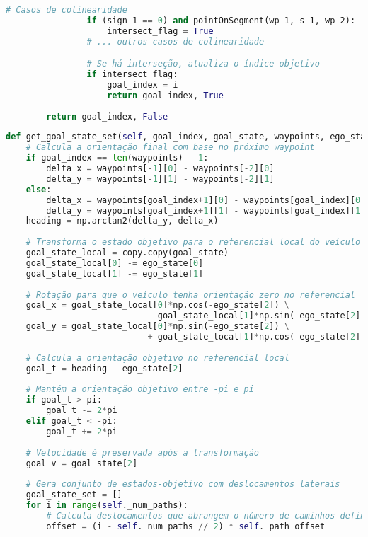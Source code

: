 \documentclass[
	12pt,				%
	oneside, %
	a4paper,			%
	english,			%
	french,				%
	spanish,			%
	brazil				%
	]{abntex2}
\begin{document}
\begin{apendicesenv}
\begin{lstlisting}[language=Python, caption=Implementação parcial da verificação de interseção com cercas virtuais., label=lst:check_stop_signs_implementation]
                # Casos de colinearidade
                if (sign_1 == 0) and pointOnSegment(wp_1, s_1, wp_2):
                    intersect_flag = True
                # ... outros casos de colinearidade

                # Se há interseção, atualiza o índice objetivo
                if intersect_flag:
                    goal_index = i
                    return goal_index, True
                    
        return goal_index, False
\end{lstlisting}

\begin{lstlisting}[language=Python, caption=Implementação do método para geração de estados-objetivo do \textit{Conformal Lattice Planner}., label=lst:get_goal_state_set_implementation]
def get_goal_state_set(self, goal_index, goal_state, waypoints, ego_state):
    # Calcula a orientação final com base no próximo waypoint
    if goal_index == len(waypoints) - 1:
        delta_x = waypoints[-1][0] - waypoints[-2][0]
        delta_y = waypoints[-1][1] - waypoints[-2][1]
    else: 
        delta_x = waypoints[goal_index+1][0] - waypoints[goal_index][0]
        delta_y = waypoints[goal_index+1][1] - waypoints[goal_index][1]
    heading = np.arctan2(delta_y, delta_x)
    
    # Transforma o estado objetivo para o referencial local do veículo
    goal_state_local = copy.copy(goal_state)
    goal_state_local[0] -= ego_state[0]
    goal_state_local[1] -= ego_state[1]
    
    # Rotação para que o veículo tenha orientação zero no referencial local
    goal_x = goal_state_local[0]*np.cos(-ego_state[2]) \
                            - goal_state_local[1]*np.sin(-ego_state[2])
    goal_y = goal_state_local[0]*np.sin(-ego_state[2]) \
                            + goal_state_local[1]*np.cos(-ego_state[2])
    
    # Calcula a orientação objetivo no referencial local
    goal_t = heading - ego_state[2]
    
    # Mantém a orientação objetivo entre -pi e pi
    if goal_t > pi:
        goal_t -= 2*pi
    elif goal_t < -pi:
        goal_t += 2*pi
    
    # Velocidade é preservada após a transformação
    goal_v = goal_state[2]
    
    # Gera conjunto de estados-objetivo com deslocamentos laterais
    goal_state_set = []
    for i in range(self._num_paths):
        # Calcula deslocamentos que abrangem o número de caminhos definido
        offset = (i - self._num_paths // 2) * self._path_offset
        

\end{lstlisting}
\end{apendicesenv}
\end{document}
